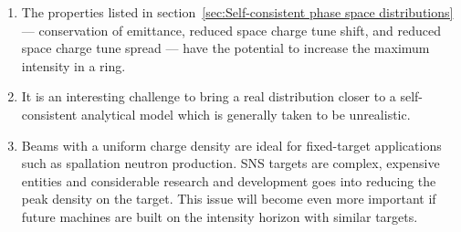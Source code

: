 \begin{enumerate}
\item 
The properties listed in section~\ref{sec:Self-consistent phase space distributions} — conservation of emittance, reduced space charge tune shift, and reduced space charge tune spread — have the potential to increase the maximum intensity in a ring.

\item
It is an interesting challenge to bring a real distribution closer to a self-consistent analytical model which is generally taken to be unrealistic. 

\item
Beams with a uniform charge density are ideal for fixed-target applications such as spallation neutron production. SNS targets are complex, expensive entities and considerable research and development goes into reducing the peak density on the target. This issue will become even more important if future machines are built on the intensity horizon with similar targets.


\end{enumerate}

